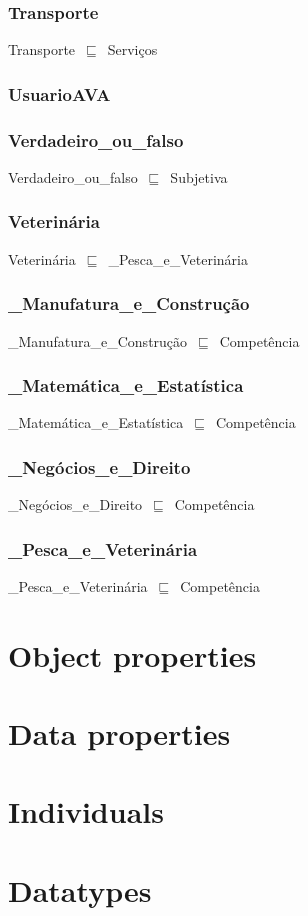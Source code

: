 \documentclass{article}
\begin{document}
\subsubsection*{Transporte}

Transporte~\ensuremath{\sqsubseteq}~Serviços~

\subsubsection*{UsuarioAVA}

\subsubsection*{Verdadeiro\_ou\_falso}

Verdadeiro\_ou\_falso~\ensuremath{\sqsubseteq}~Subjetiva~

\subsubsection*{Veterinária}

Veterinária~\ensuremath{\sqsubseteq}~\_Pesca\_e\_Veterinária~

\subsubsection*{\_Manufatura\_e\_Construção}

\_Manufatura\_e\_Construção~\ensuremath{\sqsubseteq}~Competência~

\subsubsection*{\_Matemática\_e\_Estatística}

\_Matemática\_e\_Estatística~\ensuremath{\sqsubseteq}~Competência~

\subsubsection*{\_Negócios\_e\_Direito}

\_Negócios\_e\_Direito~\ensuremath{\sqsubseteq}~Competência~

\subsubsection*{\_Pesca\_e\_Veterinária}

\_Pesca\_e\_Veterinária~\ensuremath{\sqsubseteq}~Competência~

\section*{Object properties}\section*{Data properties}\section*{Individuals}\section*{Datatypes}
\end{document}
